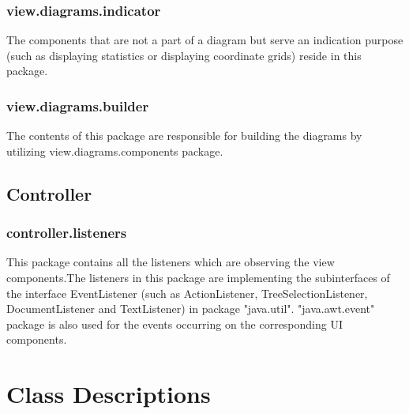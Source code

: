 \documentclass[10pt,a4paper]{report}
\begin{document}
    \subsection{view.diagrams.indicator}
    The components that are not a part of a diagram but serve an indication purpose (such as displaying statistics or displaying coordinate grids) reside in this package.
    \subsection{view.diagrams.builder}
    The contents of this package are responsible for building the diagrams by utilizing view.diagrams.components package.
    \section{Controller}
    \subsection{controller.listeners}
    This package contains all the listeners which are observing the view components.The listeners in this package are implementing the subinterfaces of the interface EventListener (such as ActionListener, TreeSelectionListener, DocumentListener and TextListener) in package "java.util". "java.awt.event" package is also used for the events occurring on the corresponding UI components.

\chapter{Class Descriptions}
\end{document}
